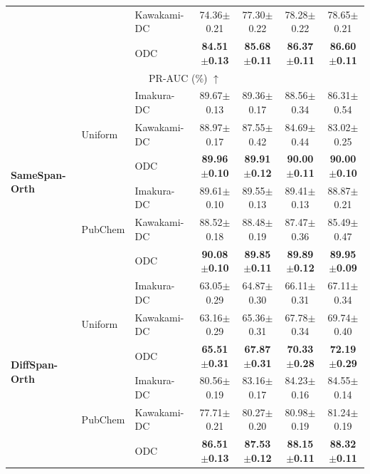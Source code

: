 \documentclass[final,3p,times]{elsarticle}
\theoremstyle{plain}
\begin{document}
\begin{table}[t]
\begin{tabular}{lllcccc}
      &  & Kawakami-DC~\cite{KawakamiDC} & 74.36$\pm$0.21 & 77.30$\pm$0.22 & 78.28$\pm$0.22 & 78.65$\pm$0.21 \\
      &  & ODC   & \textbf{84.51$\pm$0.13} & \textbf{85.68$\pm$0.11} & \textbf{86.37$\pm$0.11} & \textbf{86.60$\pm$0.11} \\
    \midrule
    \multicolumn{7}{c}{PR-AUC (\%) $\uparrow$} \\
    \midrule
    \multirow{6}{*}{\textbf{SameSpan-Orth}}
      & \multirow{3}{*}{Uniform}
        & Imakura-DC~\cite{DCframework1}   & 89.67$\pm$0.13 & 89.36$\pm$0.17 & 88.56$\pm$0.34 & 86.31$\pm$0.54 \\
      &  & Kawakami-DC~\cite{KawakamiDC} & 88.97$\pm$0.17 & 87.55$\pm$0.42 & 84.69$\pm$0.44 & 83.02$\pm$0.25 \\
      &  & ODC   & \textbf{89.96$\pm$0.10} & \textbf{89.91$\pm$0.12} & \textbf{90.00$\pm$0.11} & \textbf{90.00$\pm$0.10} \\
    \cmidrule(lr){2-7}
      & \multirow{3}{*}{PubChem}
        & Imakura-DC~\cite{DCframework1}   & 89.61$\pm$0.10 & 89.55$\pm$0.13 & 89.41$\pm$0.13 & 88.87$\pm$0.21 \\
      &  & Kawakami-DC~\cite{KawakamiDC} & 88.52$\pm$0.18 & 88.48$\pm$0.19 & 87.47$\pm$0.36 & 85.49$\pm$0.47 \\
      &  & ODC   & \textbf{90.08$\pm$0.10} & \textbf{89.85$\pm$0.11} & \textbf{89.89$\pm$0.12} & \textbf{89.95$\pm$0.09} \\
    \midrule
    \multirow{6}{*}{\textbf{DiffSpan-Orth}}
      & \multirow{3}{*}{Uniform}
        & Imakura-DC~\cite{DCframework1}   & 63.05$\pm$0.29 & 64.87$\pm$0.30 & 66.11$\pm$0.31 & 67.11$\pm$0.34 \\
      &  & Kawakami-DC~\cite{KawakamiDC} & 63.16$\pm$0.29 & 65.36$\pm$0.31 & 67.78$\pm$0.34 & 69.74$\pm$0.40 \\
      &  & ODC   & \textbf{65.51$\pm$0.31} & \textbf{67.87$\pm$0.31} & \textbf{70.33$\pm$0.28} & \textbf{72.19$\pm$0.29} \\
    \cmidrule(lr){2-7}
      & \multirow{3}{*}{PubChem}
        & Imakura-DC~\cite{DCframework1}   & 80.56$\pm$0.19 & 83.16$\pm$0.17 & 84.23$\pm$0.16 & 84.55$\pm$0.14 \\
      &  & Kawakami-DC~\cite{KawakamiDC} & 77.71$\pm$0.21 & 80.27$\pm$0.20 & 80.98$\pm$0.19 & 81.24$\pm$0.19 \\
      &  & ODC   & \textbf{86.51$\pm$0.13} & \textbf{87.53$\pm$0.12} & \textbf{88.15$\pm$0.11} & \textbf{88.32$\pm$0.11} \\
    \bottomrule
  \end{tabular}
\end{table}
\end{document}
